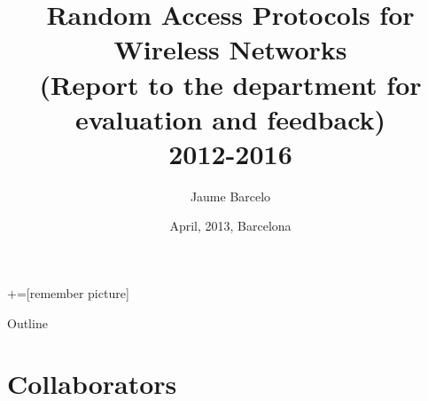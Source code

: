 \documentclass{beamer}
\title[MAC for mesh] %
{
Random Access Protocols for Wireless Networks \\
(Report to the department for evaluation and feedback) \\
2012-2016
}
\author[Barcelo] %
{
Jaume Barcelo
}
\institute[institute] %
{
Universitat Pompeu Fabra
}
\date[date] %
{
April, 2013, Barcelona
}
\begin{document}
+=[remember picture]

\begin{frame}
  \titlepage
\end{frame}

\begin{frame}{Outline}
  \tableofcontents
\end{frame}





\section{Collaborators}
\end{document}
